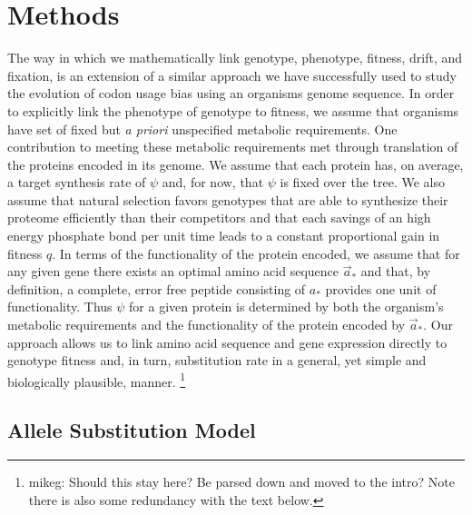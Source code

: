 \documentclass{article}
\newcommand{\aopt}{\ensuremath{a_*}\xspace}
\newcommand{\aoptvec}{\ensuremath{\Vec{a}_*}\xspace}
\begin{document}
\section*{Methods}\label{sec:methods}
The way in which we mathematically link genotype, phenotype, fitness, drift, and fixation, is an extension of a similar approach we have successfully used to study the evolution of codon usage bias using an organisms genome sequence\citep{GilchristAndWagner2006,Gilchrist2007,ShahAndGilchrist2011,GilchristEtAl2015}.
In order to explicitly link the phenotype of genotype to fitness, we assume that organisms have set of fixed but \emph{a priori} unspecified metabolic requirements.
One contribution to meeting these metabolic requirements met through translation of the proteins encoded in its genome.
We assume that each protein has, on average, a target synthesis rate of $\psi$ and, for now, that $\psi$ is fixed over the tree.
We also assume that natural selection favors genotypes that are able to synthesize their proteome efficiently than their competitors and that each savings of an high energy phosphate bond per unit time leads to a constant proportional gain in fitness $q$.
In terms of the functionality of the protein encoded, we assume that for any given gene there exists an optimal amino acid sequence \aoptvec and that, by definition, a complete, error free peptide consisting of \aopt provides one unit of functionality.
Thus $\psi$ for a given protein is determined by both the organism's metabolic requirements and the functionality of the protein encoded by \aoptvec.
Our approach allows us to link amino acid sequence and gene expression directly to genotype fitness and, in turn, substitution rate in a general, yet simple and biologically plausible, manner.
\footnote{mikeg: Should this stay here?  
  Be parsed down and moved to the intro? 
  Note there is also some redundancy with the text below.}

\subsection*{Allele Substitution Model}
\end{document}
